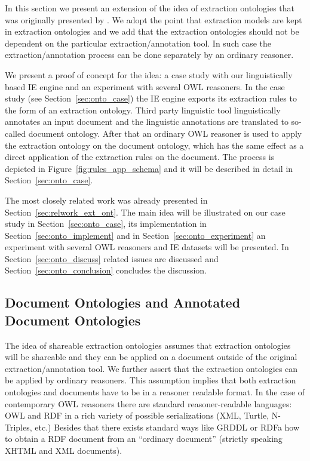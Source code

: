 In this section we present an extension of the idea of extraction ontologies that was originally presented by \cite{DBLP:conf/er/EmbleyTL02}. We adopt the point that extraction models are kept in extraction ontologies and we add that the extraction ontologies should not be dependent on the particular extraction/annotation tool. In such case the extraction/annotation process can be done separately by an ordinary reasoner.


We present a proof of concept for the idea: a case study with our linguistically based IE engine and an experiment with several OWL reasoners. In the case study (see Section~\ref{sec:onto_case}) the IE engine exports its extraction rules to the form of an extraction ontology. Third party linguistic tool linguistically annotates an input document and the linguistic annotations are translated to so-called document ontology. After that an ordinary OWL reasoner is used to apply the extraction ontology on the document ontology, which has the same effect as a direct application of the extraction rules on the document. The process is depicted in Figure~\ref{fig:rules_app_schema} and it will be described in detail in Section~\ref{sec:onto_case}.



The most closely related work was already presented in Section~\ref{sec:relwork_ext_ont}. The main idea will be illustrated on our case study in Section~\ref{sec:onto_case}, its implementation in Section~\ref{sec:onto_implement} and in Section~\ref{sec:onto_experiment} an experiment with several OWL reasoners and IE datasets will be presented. In Section~\ref{sec:onto_discuss} related issues are discussed and Section~\ref{sec:onto_conclusion} concludes the discussion.

\subsection{Document Ontologies and Annotated Document Ontologies} \label{sec:onto_doc_ont}

The idea of shareable extraction ontologies assumes that extraction ontologies will be shareable and they can be applied on a document outside of the original extraction/annotation tool. We further assert that the extraction ontologies can be applied by ordinary reasoners. This assumption implies that both extraction ontologies and documents have to be in a reasoner readable format. In the case of contemporary OWL reasoners there are standard reasoner-readable languages: OWL and RDF in a rich variety of possible serializations (XML, Turtle, N-Triples, etc.) Besides that there exists standard ways like GRDDL or RDFa how to obtain a RDF document from an ``ordinary document'' (strictly speaking XHTML and XML documents).

